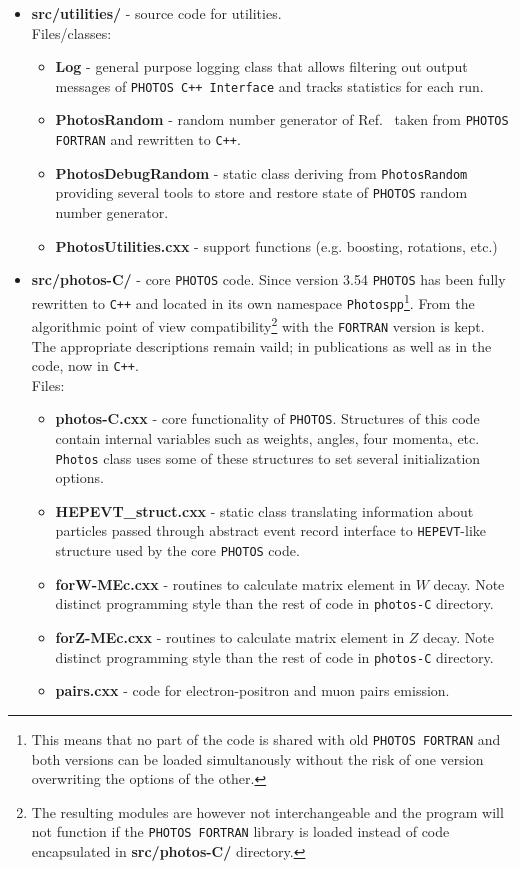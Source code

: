 \documentclass[]{Photos_interface_design}
\begin{document}
\begin{itemize}
\item {\bf src/utilities/ } - source code for utilities.\\
  Files/classes:
  \begin{itemize}
  \item { \bf Log} - general purpose logging class that allows filtering out output messages 
      of {\tt PHOTOS {\tt C++} Interface} and tracks statistics for each run.
  \item { \bf PhotosRandom} - random number generator of Ref.~\cite{James:1988vf,marsaglia:1987} taken from {\tt PHOTOS FORTRAN} and rewritten to {\tt C++}.
  \item { \bf PhotosDebugRandom} - static class deriving from {\tt PhotosRandom} providing several tools to store and restore
                                   state of {\tt PHOTOS} random number generator.
  \item { \bf PhotosUtilities.cxx} - support functions (e.g. boosting, rotations, etc.)
  \end{itemize}

\item {\bf  src/photos-C/ } - core {\tt PHOTOS} code. Since version 3.54 {\tt PHOTOS} has been
      fully rewritten to {\tt C++} and located in its own namespace {\tt Photospp}\footnote{This means that no part of
      the code is shared with old {\tt PHOTOS FORTRAN} and both versions can be loaded simultanously without the
      risk of one version overwriting the options of the other.}. From the algorithmic point of view
 compatibility\footnote{The resulting modules are however not interchangeable and the program
 will not function if the {\tt PHOTOS FORTRAN} library is loaded instead of code encapsulated 
in {\bf src/photos-C/ } directory.
}
 with the {\tt FORTRAN} version is kept. The appropriate descriptions remain vaild;
in publications as well as in the code, now in {\tt C++}. \\
  Files:
  \begin{itemize}
    \item { \bf photos-C.cxx } - core functionality of {\tt PHOTOS}. Structures of this code contain internal variables such as weights, angles, four momenta, etc.
                                 {\tt Photos} class uses some of these structures to set several initialization options.
    \item { \bf HEPEVT\_struct.cxx } - static class translating information about particles passed through abstract event record interface
                                       to {\tt HEPEVT}-like structure used by the core {\tt PHOTOS} code.
    \item { \bf forW-MEc.cxx } - routines to calculate matrix element in $W$ decay. 
                                 Note distinct programming style than the rest of code in {\tt photos-C} directory.
    \item { \bf forZ-MEc.cxx } - routines to calculate matrix element in $Z$ decay. 
                                 Note distinct programming style than the rest of code in {\tt photos-C} directory.
    \item { \bf pairs.cxx } - code for electron-positron and muon pairs emission.
    \end{itemize}



\end{itemize}
\end{document}
